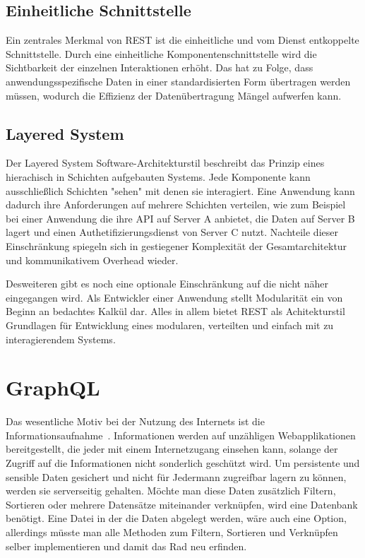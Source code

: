 \subsection{Einheitliche Schnittstelle}
Ein zentrales Merkmal von REST ist die einheitliche und vom Dienst entkoppelte Schnittstelle.
Durch eine einheitliche Komponentenschnittstelle wird die Sichtbarkeit der einzelnen Interaktionen erhöht.
Das hat zu Folge, dass anwendungsspezifische Daten in einer standardisierten Form übertragen werden müssen,
wodurch die Effizienz der Datenübertragung Mängel aufwerfen kann.

\subsection{Layered System}
Der Layered System Software-Architekturstil beschreibt das Prinzip eines hierachisch in Schichten aufgebauten Systems.
Jede Komponente kann ausschließlich Schichten "sehen" mit denen sie interagiert.
Eine Anwendung kann dadurch ihre Anforderungen auf mehrere Schichten verteilen, wie zum Beispiel bei einer Anwendung die ihre API auf Server A anbietet,
die Daten auf Server B lagert und einen Authetifizierungsdienst von Server C nutzt.
Nachteile dieser Einschränkung spiegeln sich in gestiegener Komplexität der Gesamtarchitektur und kommunikativem Overhead wieder.

Desweiteren gibt es noch eine optionale Einschränkung auf die nicht näher eingegangen wird.
Als Entwickler einer Anwendung stellt Modularität ein von Beginn an bedachtes Kalkül dar.
Alles in allem bietet REST als Achitekturstil Grundlagen für Entwicklung eines modularen, verteilten und einfach mit zu interagierendem Systems.

\section{GraphQL}
\label{sec:basics:graphql}
Das wesentliche Motiv bei der Nutzung des Internets ist die Informationsaufnahme~\cite{statista-1}\cite{ard-zdf}.
Informationen werden auf unzähligen Webapplikationen bereitgestellt, die jeder mit einem Internetzugang einsehen kann,
solange der Zugriff auf die Informationen nicht sonderlich geschützt wird.
Um persistente und sensible Daten gesichert und nicht für Jedermann zugreifbar lagern zu können, werden sie serverseitig gehalten.
Möchte man diese Daten zusätzlich Filtern, Sortieren oder mehrere Datensätze miteinander verknüpfen, wird eine Datenbank benötigt.
Eine Datei in der die Daten abgelegt werden, wäre auch eine Option, allerdings müsste man alle Methoden zum Filtern, Sortieren und Verknüpfen
selber implementieren und damit das Rad neu erfinden.

